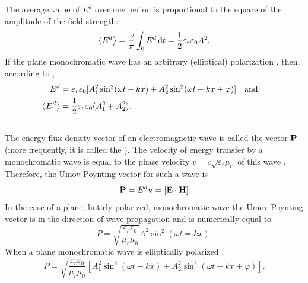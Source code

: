 The average value of $E^{d}$ over one period is proportional to the square of the amplitude of the field strength:
\begin{equation*}%
\expval{E^{d}} = \frac{\omega}{\pi} \int_{0} E^{d} \, \dd t = \frac{1}{2} \varepsilon_{r} \varepsilon_{0} A^{2}.
\end{equation*}
If the plane monochromatic wave has an arbitrary (elliptical)
polarization , then, according to ,
\begin{align*}%
E^{d} & = \varepsilon_{r} \varepsilon_{0} [A_{1}^{2} \sin^{2} (\omega t - kx) + A_{2}^{2} \sin^{2}(\omega t - kx + \varphi)] \qand \\
\expval{E^{d}} & = \frac{1}{2} \varepsilon_{r} \varepsilon_{0} (A_{1}^{2} + A_{2}^{2}).
\end{align*}

\subsection{}\label{31.2.3} The energy flux density vector  of an electromagnetic
wave is called the  vector $\vb{P}$ (more
frequently, it is called the ). The velocity of energy transfer by a monochromatic wave is equal to the phase velocity $v = c\sqrt{\varepsilon_{r}\mu_{r}}$ of this wave . Therefore, the Umov-Poynting vector for such a wave is
\begin{equation*}%
\vb{P} = E^{d} \vb{v} = [\vb{E}\cdot \vb{H}]
\end{equation*}
In the case of a plane, lintirly polarized, monochromatic wave  the Umov-Poynting vector is in the direction of wave propagation and is numerically equal to
\begin{equation*}%
P = \sqrt{\frac{\varepsilon_{r} \varepsilon_{0} }{\mu_{r}\mu_{0}}} A^{2} \sin^{2} (\omega t = kx).
\end{equation*}
When a plane monochromatic wave is elliptically polarized
,
\begin{equation*}%
P = \sqrt{\frac{\varepsilon_{r} \varepsilon_{0} }{\mu_{r}\mu_{0}}} [A_{1}^{2} \sin^{2} (\omega t - kx) + A_{2}^{2} \sin^{2}(\omega t - kx + \varphi)].
\end{equation*}

